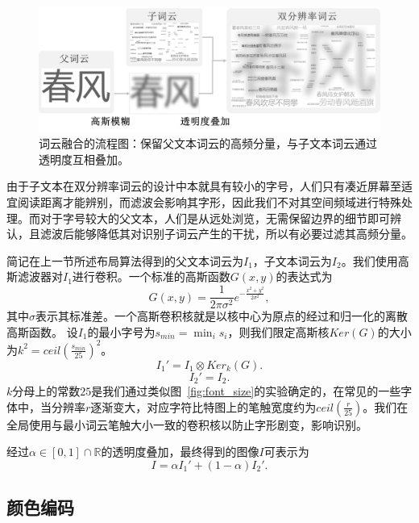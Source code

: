 \begin{figure}[htbp]
	\centering
	\includegraphics[width=\textwidth]{figures/blend.png}
	\caption{词云融合的流程图：保留父文本词云的高频分量，与子文本词云通过透明度互相叠加。}
	\label{fig:blend}
\end{figure}

由于子文本在双分辨率词云的设计中本就具有较小的字号，人们只有凑近屏幕至适宜阅读距离才能辨别，而滤波会影响其字形，因此我们不对其空间频域进行特殊处理。而对于字号较大的父文本，人们是从远处浏览，无需保留边界的细节即可辨认，且滤波后能够降低其对识别子词云产生的干扰，所以有必要过滤其高频分量。

简记在上一节所述布局算法得到的父文本词云为$I_1$，子文本词云为$I_2$。我们使用高斯滤波器对$I_1$进行卷积。一个标准的高斯函数$G(x,y)$的表达式为
\begin{equation*}
G(x,y) = \frac{1}{2\pi \sigma^2}e^{-\frac{x^2+y^2}{2\sigma^2}},
\end{equation*}
其中$\sigma$表示其标准差。一个高斯卷积核就是以核中心为原点的经过和归一化的离散高斯函数。
设$I_1$的最小字号为$s_{min} = \min_{i} s_i$，则我们限定高斯核$Ker(G)$的大小为$k^2 = ceil(\frac{s_{min}}{25})^2$。
\begin{equation*}
I_1' = I_1 \otimes Ker_k(G).
\end{equation*}
\begin{equation*}
I_2' = I_2.
\end{equation*}
$k$分母上的常数$25$是我们通过类似图~\ref{fig:font_size}的实验确定的，在常见的一些字体中，当分辨率$r$逐渐变大，对应字符比特图上的笔触宽度约为$ceil(\frac{r}{25})$。我们在全局使用与最小词云笔触大小一致的卷积核以防止字形剧变，影响识别。

经过$\alpha\in [0,1]\cap \mathbb{R}$的透明度叠加，最终得到的图像$I$可表示为
\begin{equation*}
I = \alpha I_1' + (1-\alpha)I_2'.
\end{equation*}


\subsection{颜色编码}

